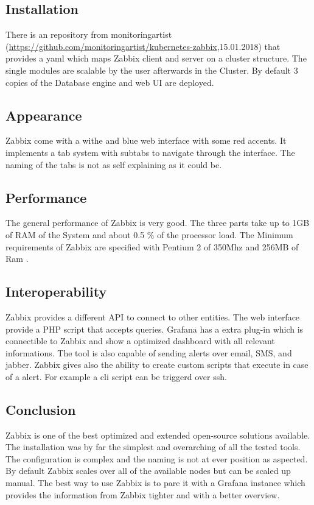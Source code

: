 \subsection{Installation}
There is an repository from monitoringartist (\url{https://github.com/monitoringartist/kubernetes-zabbix},15.01.2018) that provides a yaml which maps Zabbix client and server on a cluster structure. The single modules are scalable by the user afterwards in the Cluster. By default 3 copies of the Database engine and web UI are deployed.
\subsection{Appearance}%
Zabbix come with a withe and blue web interface with some red accents. It implements a tab system with subtabs to navigate through the interface. The naming of the tabs is not as self explaining as it could be.  
\subsection{Performance}
The general performance of Zabbix is very good. The three parts take up to 1GB of RAM of the System and about 0.5 \% of the processor load. The Minimum requirements of Zabbix are specified with Pentium 2 of 350Mhz and 256MB of Ram \cite{Marik2014}.
\subsection{Interoperability}
Zabbix provides a different API to connect to other entities. The web interface  provide a PHP script that accepts queries. Grafana has a extra plug-in which is connectible to Zabbix and show a optimized dashboard with all relevant informations. The tool is also capable of sending alerts over email, SMS, and jabber. Zabbix gives also the ability to create custom scripts that execute in case of a alert. For example a cli script can be triggerd over ssh. 
\subsection{Conclusion}
Zabbix is one of the best optimized and extended open-source solutions available. The installation was by far the simplest and overarching of all the tested tools. The configuration is complex and the naming is not at ever position as aspected. By default Zabbix scales over all of the available nodes but can be scaled up manual. The best way to use Zabbix is to pare it with a Grafana instance which provides the information from Zabbix tighter and with a better overview.

